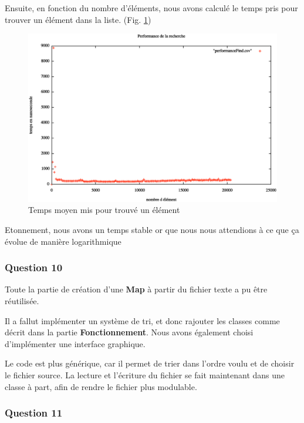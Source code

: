 \documentclass[a4paper]{article}
\begin{document}
Ensuite, en fonction du nombre d'éléments, nous avons calculé le temps pris pour trouver un élément dans la liste. (Fig. \ref{perfoFind})

\begin{figure} [H]
\begin{center}
\includegraphics[scale=0.4]{performanceFind.eps}
\caption{Temps moyen mis pour trouvé un élément}
\label{perfoFind}
\end{center}
\end{figure}

Etonnement, nous avons un temps stable or que nous nous attendions à ce que ça évolue de manière logarithmique

\subsubsection*{Question 10}

Toute la partie de création d'une \textbf{Map} à partir du fichier texte a pu être réutilisée.

 Il a fallut implémenter un système de tri, et donc rajouter les classes comme décrit dans la partie \textbf{Fonctionnement}. Nous avons également choisi d'implémenter une interface graphique.


Le code est plus générique, car il permet de trier dans l'ordre voulu et de choisir le fichier source. La lecture et l'écriture du fichier se fait maintenant dans une classe à part, afin de rendre le fichier plus modulable.

\subsubsection*{Question 11}
\end{document}
